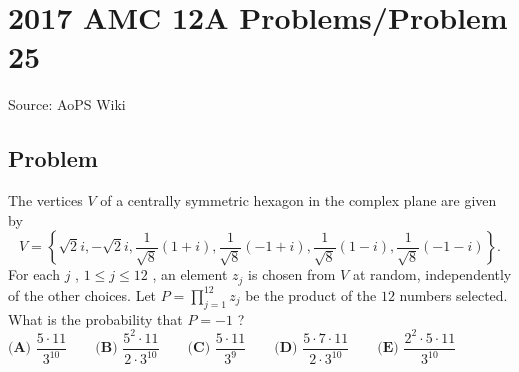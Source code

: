 \documentclass[12pt]{article}
\begin{document}
\section*{{2017 AMC 12A Problems/Problem 25}}
Source: AoPS Wiki

\subsection*{Problem}
The vertices $V$ of a centrally symmetric hexagon in the complex plane are given by \[V=\left\{ \sqrt{2}i,-\sqrt{2}i, \frac{1}{\sqrt{8}}(1+i),\frac{1}{\sqrt{8}}(-1+i),\frac{1}{\sqrt{8}}(1-i),\frac{1}{\sqrt{8}}(-1-i) \right\}.\] For each $j$ , $1\leq j\leq 12$ , an element $z_j$ is chosen from $V$ at random, independently of the other choices. Let $P={\prod}_{j=1}^{12}z_j$ be the product of the $12$ numbers selected. What is the probability that $P=-1$ ? $\textbf{(A) } \dfrac{5\cdot11}{3^{10}} \qquad \textbf{(B) } \dfrac{5^2\cdot11}{2\cdot3^{10}} \qquad \textbf{(C) } \dfrac{5\cdot11}{3^{9}} \qquad \textbf{(D) } \dfrac{5\cdot7\cdot11}{2\cdot3^{10}} \qquad \textbf{(E) } \dfrac{2^2\cdot5\cdot11}{3^{10}}$
\end{document}
